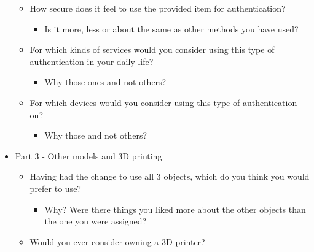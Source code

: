 \documentclass{l4proj}
\begin{document}
\begin{appendices}
\begin{itemize}
\begin{itemize}
\begin{itemize}
        \end{itemize}
        \item How secure does it feel to use the provided item for authentication?
        \begin{itemize}
            \item Is it more, less or about the same as other methods you have used?
        \end{itemize}
        \item For which kinds of services would you consider using this type of authentication in your daily life?
        \begin{itemize}
            \item Why those ones and not others?
        \end{itemize}
        \item For which devices would you consider using this type of authentication on?
        \begin{itemize}
            \item Why those and not others?
        \end{itemize}
    \end{itemize}
    \item Part 3 - Other models and 3D printing
    \begin{itemize}
        \item Having had the change to use all 3 objects, which do you think you would prefer to use?
        \begin{itemize}
            \item Why? Were there things you liked more about the other objects than the one you were assigned?
        \end{itemize}
        \item Would you ever consider owning a 3D printer?
    \end{itemize}
    
\end{itemize}


\end{appendices}
\end{document}
